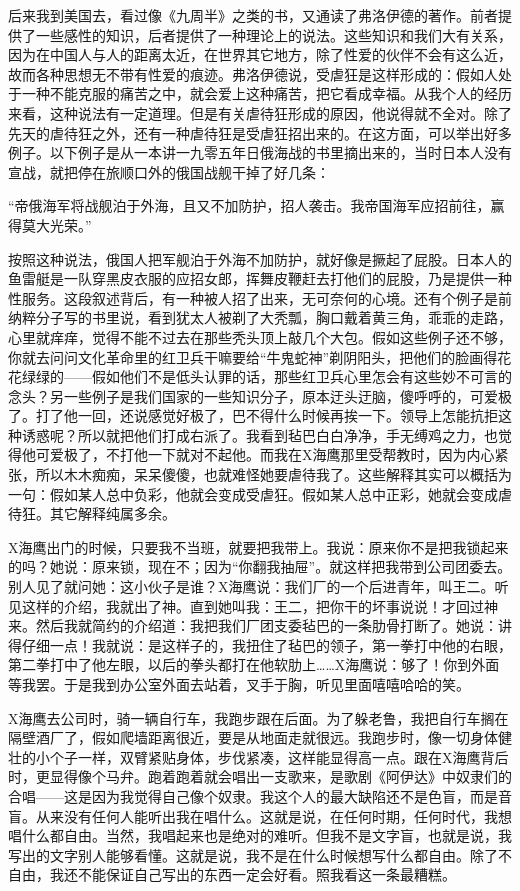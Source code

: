 后来我到美国去，看过像《九周半》之类的书，又通读了弗洛伊德的著作。前者提供了一些感性的知识，后者提供了一种理论上的说法。这些知识和我们大有关系，因为在中国人与人的距离太近，在世界其它地方，除了性爱的伙伴不会有这么近，故而各种思想无不带有性爱的痕迹。弗洛伊德说，受虐狂是这样形成的：假如人处于一种不能克服的痛苦之中，就会爱上这种痛苦，把它看成幸福。从我个人的经历来看，这种说法有一定道理。但是有关虐待狂形成的原因，他说得就不全对。除了先天的虐待狂之外，还有一种虐待狂是受虐狂招出来的。在这方面，可以举出好多例子。以下例子是从一本讲一九零五年日俄海战的书里摘出来的，当时日本人没有宣战，就把停在旅顺口外的俄国战舰干掉了好几条： 

“帝俄海军将战舰泊于外海，且又不加防护，招人袭击。我帝国海军应招前往，赢得莫大光荣。” 

按照这种说法，俄国人把军舰泊于外海不加防护，就好像是撅起了屁股。日本人的鱼雷艇是一队穿黑皮衣服的应招女郎，挥舞皮鞭赶去打他们的屁股，乃是提供一种性服务。这段叙述背后，有一种被人招了出来，无可奈何的心境。还有个例子是前纳粹分子写的书里说，看到犹太人被剃了大秃瓢，胸口戴着黄三角，乖乖的走路，心里就痒痒，觉得不能不过去在那些秃头顶上敲几个大包。假如这些例子还不够，你就去问问文化革命里的红卫兵干嘛要给“牛鬼蛇神”剃阴阳头，把他们的脸画得花花绿绿的——假如他们不是低头认罪的话，那些红卫兵心里怎会有这些妙不可言的念头？另一些例子是我们国家的一些知识分子，原本迂头迂脑，傻呼呼的，可爱极了。打了他一回，还说感觉好极了，巴不得什么时候再挨一下。领导上怎能抗拒这种诱惑呢？所以就把他们打成右派了。我看到毡巴白白净净，手无缚鸡之力，也觉得他可爱极了，不打他一下就对不起他。而我在X海鹰那里受帮教时，因为内心紧张，所以木木痴痴，呆呆傻傻，也就难怪她要虐待我了。这些解释其实可以概括为一句：假如某人总中负彩，他就会变成受虐狂。假如某人总中正彩，她就会变成虐待狂。其它解释纯属多余。 

X海鹰出门的时候，只要我不当班，就要把我带上。我说：原来你不是把我锁起来的吗？她说：原来锁，现在不；因为“你翻我抽屉”。就这样把我带到公司团委去。别人见了就问她：这小伙子是谁？X海鹰说：我们厂的一个后进青年，叫王二。听见这样的介绍，我就出了神。直到她叫我：王二，把你干的坏事说说！才回过神来。然后我就简约的介绍道：我把我们厂团支委毡巴的一条肋骨打断了。她说：讲得仔细一点！我就说：是这样子的，我扭住了毡巴的领子，第一拳打中他的右眼，第二拳打中了他左眼，以后的拳头都打在他软肋上……X海鹰说：够了！你到外面等我罢。于是我到办公室外面去站着，叉手于胸，听见里面嘻嘻哈哈的笑。 

X海鹰去公司时，骑一辆自行车，我跑步跟在后面。为了躲老鲁，我把自行车搁在隔壁酒厂了，假如爬墙距离很近，要是从地面走就很远。我跑步时，像一切身体健壮的小个子一样，双臂紧贴身体，步伐紧凑，这样能显得高一点。跟在X海鹰背后时，更显得像个马弁。跑着跑着就会唱出一支歌来，是歌剧《阿伊达》中奴隶们的合唱——这是因为我觉得自己像个奴隶。我这个人的最大缺陷还不是色盲，而是音盲。从来没有任何人能听出我在唱什么。这就是说，在任何时期，任何时代，我想唱什么都自由。当然，我唱起来也是绝对的难听。但我不是文字盲，也就是说，我写出的文字别人能够看懂。这就是说，我不是在什么时候想写什么都自由。除了不自由，我还不能保证自己写出的东西一定会好看。照我看这一条最糟糕。 

